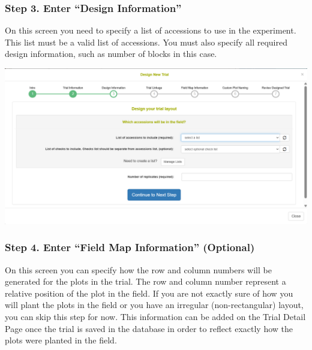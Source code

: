 \documentclass[
  12pt,
]{book}
\begin{document}
\hypertarget{step-3.-enter-design-information}{%
\subsubsection*{Step 3. Enter ``Design Information''}\label{step-3.-enter-design-information}}


On this screen you need to specify a list of accessions to use in the experiment. This list must be a valid list of accessions. You must also specify all required design information, such as number of blocks in this case.

\begin{center}\includegraphics[width=0.95\linewidth]{assets/images/trial_create_form_3} \end{center}

\hypertarget{step-4.-enter-field-map-information-optional}{%
\subsubsection*{Step 4. Enter ``Field Map Information'' (Optional)}\label{step-4.-enter-field-map-information-optional}}


On this screen you can specify how the row and column numbers will be generated for the plots in the trial. The row and column number represent a relative position of the plot in the field. If you are not exactly sure of how you will plant the plots in the field or you have an irregular (non-rectangular) layout, you can skip this step for now. This information can be added on the Trial Detail Page once the trial is saved in the database in order to reflect exactly how the plots were planted in the field.
\end{document}
